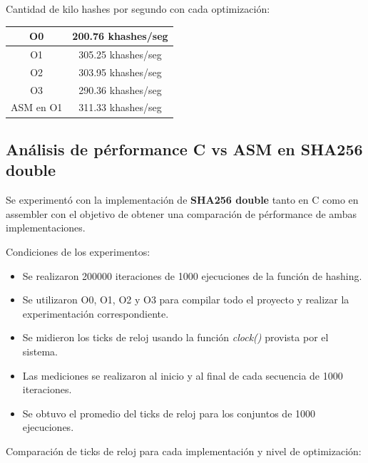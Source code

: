 \documentclass[a4paper, 10pt, twoside]{article}
\begin{document}
Cantidad de kilo hashes por segundo con cada optimización:

\begin{center}
  \begin{tabular}{ | c | c | }
    \hline
   O0 & 200.76 khashes/seg \\ \hline
   O1 & 305.25 khashes/seg \\ \hline
   O2 & 303.95 khashes/seg \\ \hline
   O3 & 290.36 khashes/seg \\ \hline
   ASM en O1 & 311.33 khashes/seg \\ \hline
  \end{tabular}
\end{center}

\subsection{Análisis de pérformance C vs ASM en SHA256 double}
Se experimentó con la implementación de \textbf{SHA256 double} tanto en C como en assembler con el objetivo de obtener una comparación de pérformance de ambas implementaciones.

Condiciones de los experimentos:
\begin{itemize}
  \item Se realizaron 200000 iteraciones de 1000 ejecuciones de la función de hashing.
  \item Se utilizaron O0, O1, O2 y O3 para compilar todo el proyecto y realizar la experimentación correspondiente.
  \item Se midieron los ticks de reloj usando la función \textit{clock()} provista por el sistema.
  \item Las mediciones se realizaron al inicio y al final de cada secuencia de 1000 iteraciones.
  \item Se obtuvo el promedio del ticks de reloj para los conjuntos de 1000 ejecuciones.
\end{itemize}

Comparación de ticks de reloj para cada implementación y nivel de optimización:

\begin{center}
\end{center}
\end{document}
